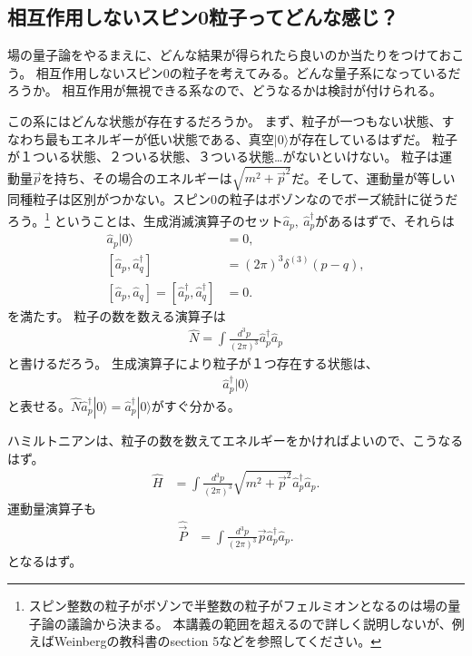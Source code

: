 \documentclass[10pt,a4paper]{jarticle}
\begin{document}
\subsection{相互作用しないスピン0粒子ってどんな感じ？}
場の量子論をやるまえに、どんな結果が得られたら良いのか当たりをつけておこう。
相互作用しないスピン0の粒子を考えてみる。どんな量子系になっているだろうか。
相互作用が無視できる系なので、どうなるかは検討が付けられる。

この系にはどんな状態が存在するだろうか。
まず、粒子が一つもない状態、すなわち最もエネルギーが低い状態である、真空$|0\rangle$が存在しているはずだ。
粒子が１ついる状態、２ついる状態、３ついる状態\dots がないといけない。
粒子は運動量$\vec p$を持ち、その場合のエネルギーは$\sqrt{m^2 + \vec p^2}$だ。そして、運動量が等しい同種粒子は区別がつかない。スピン0の粒子はボゾンなのでボーズ統計に従うだろう。\footnote{
スピン整数の粒子がボゾンで半整数の粒子がフェルミオンとなるのは場の量子論の議論から決まる。
本講義の範囲を超えるので詳しく説明しないが、例えばWeinbergの教科書のsection 5などを参照してください。
}
ということは、生成消滅演算子のセット$\hat a_p,~\hat a_p^\dagger$があるはずで、それらは
\begin{align}
\hat a_p |0\rangle &= 0, \\
[\hat a_p, \hat a_q^\dagger] &= (2\pi)^3 \delta^{(3)}(p-q), \\
[\hat a_p, \hat a_q] = [\hat a_p^\dagger, \hat a_q^\dagger] &= 0.
\end{align}
を満たす。
粒子の数を数える演算子は
\begin{align}
\hat N = \int \frac{d^3 p}{(2\pi)^3} \hat a_p^\dagger \hat a_p
\end{align}
と書けるだろう。
%
生成演算子により粒子が１つ存在する状態は、
\begin{align}
\hat a_p^\dagger |0\rangle
\end{align}
と表せる。$\hat N \hat a_p^\dagger |0\rangle = \hat a_p^\dagger |0\rangle$がすぐ分かる。


ハミルトニアンは、粒子の数を数えてエネルギーをかければよいので、こうなるはず。
\begin{align}
\hat H &= \int \frac{d^3 p}{(2\pi)^3} \sqrt{m^2 + \vec p^2} \hat a_p^\dagger \hat a_p. \label{eq:hamiltonian spin 0}
\end{align}
運動量演算子も
\begin{align}
\hat {\vec P} &= \int \frac{d^3 p}{(2\pi)^3} \vec p \hat a_p^\dagger \hat a_p. \label{eq:momentum spin 0}
\end{align}
となるはず。
\end{document}

